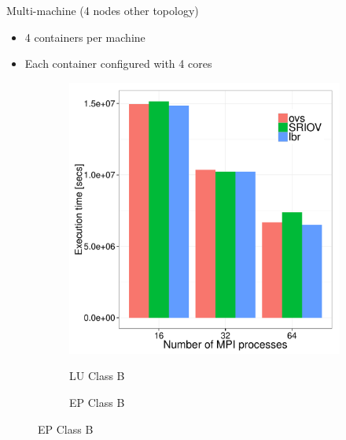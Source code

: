 \documentclass[11pt,xcolor=dvipsnames,presentation]{beamer}
\begin{document}
\begin{frame}[label=sec-4-0-12]{Multi-machine (4 nodes other topology)}
\begin{itemize}
\item 4 containers per machine
\item Each container configured with 4 cores
\end{itemize}


\begin{figure}
  \centering
  \begin{subfigure}[b]{0.42\textwidth}
    \caption{LU Class B}
    \includegraphics[scale=0.25,angle=0]{figures/inter-container-topo-luB.pdf}
    \label{fig:epkernelversion}
  \end{subfigure}
  \begin{subfigure}[b]{0.32\textwidth}
    \caption{EP Class B}

\end{subfigure}
\end{figure}
\end{frame}
\end{document}
